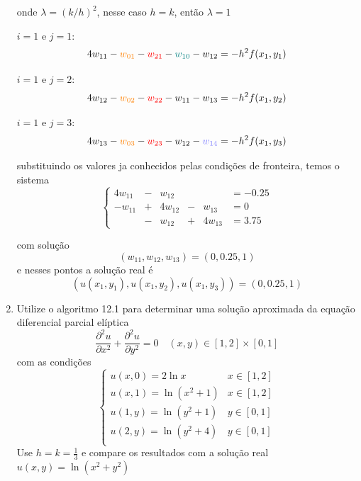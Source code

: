 \documentclass[a4paper, 11pt]{report}
\begin{document}
\begin{enumerate}[leftmargin=*]
\begin{minipage}{0.7\textwidth}
        onde $\lambda = (k/h)^2$, nesse caso $h = k$, então $\lambda = 1$
    
        $i = 1$ e $j = 1$:
        \[
            4 w_{11} - \textcolor{orange}{w_{01}} - \textcolor{red}{w_{21}} - \textcolor{teal}{w_{10}} - w_{12} = -h^2 f(x_1, y_1)
        \]
    
        $i = 1$ e $j = 2$:
        \[
            4 w_{12} - \textcolor{orange}{w_{02}} - \textcolor{red}{w_{22}} - w_{11} - w_{13} = -h^2 f(x_1, y_2)
        \]
    
        $i = 1$ e $j = 3$:
        \[
            4 w_{13} - \textcolor{orange}{w_{03}} - \textcolor{red}{w_{23}} - w_{12} - \textcolor{blue!50}{w_{14}} = -h^2 f(x_1, y_3)
        \]
    \end{minipage}

    \medskip

    substituindo os valores ja conhecidos pelas condições de fronteira, temos o sistema
    \[
        \left\{ 
            \begin{array}{rlrlrl}
                4w_{11} &- &w_{12}  & &        &= -0.25 \\
                -w_{11} &+ &4w_{12} &- &w_{13} &= 0\\
                        &- &w_{12}  &+&4w_{13} &= 3.75
            \end{array}
        \right.
    \]

    com solução
    \[
        (w_{11}, w_{12}, w_{13}) = (0, 0.25, 1)
    \]
    e nesses pontos a solução real é
    \[
        (u(x_1, y_1), u(x_1, y_2), u(x_1, y_3)) = (0, 0.25, 1)
    \]
    

    \item Utilize o algoritmo 12.1 para determinar uma solução aproximada da equação diferencial parcial elíptica
    \[
        \dfrac{\partial^2 u}{\partial x^2} + \dfrac{\partial^2 u}{\partial y^2} = 0 \quad (x,y) \in [1,2] \times [0,1]
    \]
    com as condições
    \[
        \left\{  
            \begin{array}{ll}
                u(x,0) = 2 \ln x & x \in [1,2]\\  
                u(x,1) = \ln (x^2 + 1) & x \in [1,2]\\
                u(1,y) = \ln (y^2 + 1) & y \in [0,1]\\
                u(2,y) = \ln (y^2 + 4) & y \in [0,1]\\
            \end{array}
        \right.
    \]
    Use $h = k = \frac{1}{3}$ e compare os resultados com a solução real $u(x,y) = \ln (x^2 + y^2)$


\end{enumerate}
\end{document}
